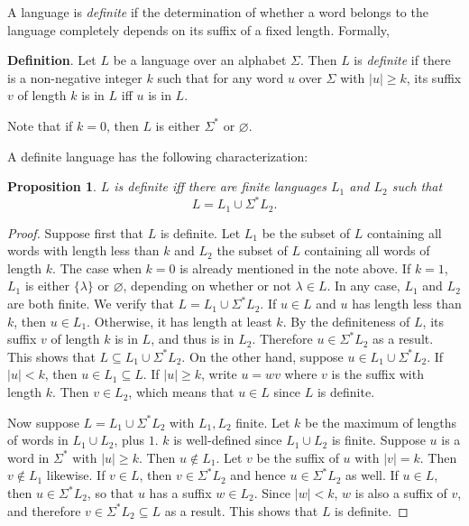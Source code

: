 \documentclass[12pt]{article}
\newtheorem{prop}{Proposition}
\begin{document}
A language is \emph{definite} if the determination of whether a word belongs to the language completely depends on its suffix of a fixed length.  Formally,

\textbf{Definition}.  Let $L$ be a language over an alphabet $\Sigma$.  Then $L$ is \emph{definite} if there is a non-negative integer $k$ such that for any word $u$ over $\Sigma$ with $|u|\ge k$, its suffix $v$ of length $k$ is in $L$ iff $u$ is in $L$.

Note that if $k=0$, then $L$ is either $\Sigma^*$ or $\varnothing$.

A definite language has the following characterization:
\begin{prop}  $L$ is definite iff there are finite languages $L_1$ and $L_2$ such that $$L=L_1\cup \Sigma^* L_2.$$
\end{prop}
\begin{proof}
Suppose first that $L$ is definite.  Let $L_1$ be the subset of $L$ containing all words with length less than $k$ and $L_2$ the subset of $L$ containing all words of length $k$.  The case when $k=0$ is already mentioned in the note above.  If $k=1$, $L_1$ is either $\lbrace \lambda \rbrace$ or $\varnothing$, depending on whether or not $\lambda\in L$.  In any case, $L_1$ and $L_2$ are both finite.  We verify that $L=L_1\cup \Sigma^*L_2$.  If $u\in L$ and $u$ has length less than $k$, then $u\in L_1$.  Otherwise, it has length at least $k$.  By the definiteness of $L$, its suffix $v$ of length $k$ is in $L$, and thus is in $L_2$.  Therefore $u\in \Sigma^*L_2$ as a result.  This shows that $L\subseteq L_1\cup \Sigma^*L_2$.  On the other hand, suppose $u \in L_1\cup \Sigma^*L_2$.  If $|u|<k$, then $u\in L_1 \subseteq L$.  If $|u|\ge k$, write $u=wv$ where $v$ is the suffix with length $k$.  Then $v\in L_2$, which means that $u\in L$ since $L$ is definite.

Now suppose $L=L_1\cup \Sigma^* L_2$ with $L_1,L_2$ finite.  Let $k$ be the maximum of lengths of words in $L_1\cup L_2$, plus $1$.  $k$ is well-defined since $L_1\cup L_2$ is finite.  Suppose $u$ is a word in $\Sigma^*$ with $|u|\ge k$.  Then $u\notin L_1$.  Let $v$ be the suffix of $u$ with $|v|=k$.  Then $v\notin L_1$ likewise.  If $v\in L$, then $v\in \Sigma^*L_2$ and hence $u\in \Sigma^*L_2$ as well.  If $u\in L$, then $u\in \Sigma^*L_2$, so that $u$ has a suffix $w\in L_2$.  Since $|w|<k$, $w$ is also a suffix of $v$, and therefore $v\in \Sigma^*L_2 \subseteq L$ as a result.  This shows that $L$ is definite.
\end{proof}
\end{document}
